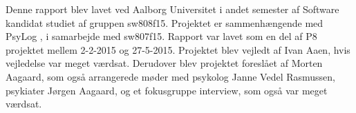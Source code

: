Denne rapport blev lavet ved Aalborg Universitet i andet semester af Software kandidat studiet af gruppen sw808f15.
Projektet er sammenhængende med PsyLog \citep{misc:faellesrapp}, i samarbejde med sw807f15.
Rapport var lavet som en del af P8 projektet mellem 2-2-2015 og 27-5-2015.
Projektet blev vejledt af Ivan Aaen, hvis vejledelse var meget værdsat.
Derudover blev projektet foreslået af Morten Aagaard, som også arrangerede møder med psykolog Janne Vedel Rasmussen, psykiater Jørgen Aagaard, og et fokusgruppe interview, som også var meget værdsat.